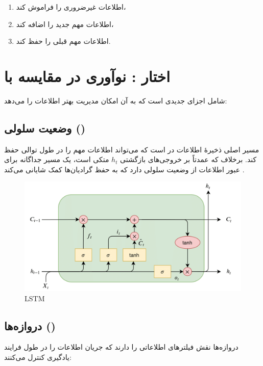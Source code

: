 \begin{enumerate}
	\item اطلاعات غیرضروری را فراموش کند،
	\item اطلاعات مهم جدید را اضافه کند،
	\item اطلاعات مهم قبلی را حفظ کند.
\end{enumerate}

\section{اختار : نوآوری در مقایسه با }
 شامل اجزای جدیدی است که به آن امکان مدیریت بهتر اطلاعات را می‌دهد:




\subsection{وضعیت سلولی ()}
مسیر اصلی ذخیرهٔ اطلاعات در  است که می‌تواند اطلاعات مهم را در طول توالی حفظ کند. برخلاف  که عمدتاً بر خروجی‌های بازگشتی \( h_t \) متکی است،  یک مسیر جداگانه برای عبور اطلاعات از وضعیت سلولی دارد که به حفظ گرادیان‌ها کمک شایانی می‌کند
\cite{hochreiter1997long}.


 \begin{figure}[h]
	\centering
	\begin{minipage}[b]{0.7\textwidth}
		\centering
		\includegraphics[width=\textwidth]{transformer_images/lstm.png}
		\caption{LSTM}
		\label{fig:LSTM}
	\end{minipage}
	\hfill
	
\end{figure}


\subsection{دروازه‌ها ()}
دروازه‌ها نقش فیلترهای اطلاعاتی را دارند که جریان اطلاعات را در طول فرایند یادگیری کنترل می‌کنند:

